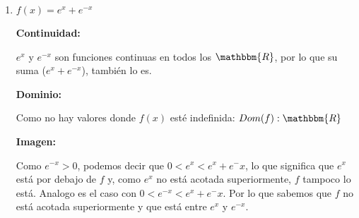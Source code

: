 \documentclass[12pt]{article}
\begin{document}
\begin{enumerate}[\hspace{9px} a)]
        \textbf{Crecencia: }
            \begin{equation*}
                f'(x)>0 \Rightarrow e^{\sin(x)}\cdot\cos(x)>0
            \end{equation*}

            Como \(e^{\sin(x)}\) es mayor a o siempre, \(f'(x)\) ser\'a mayor a 0 cuando \(\cos(x)>0\)\medskip

            Sabemos, por la definici\'on de \(\cos(x)\), que este es mayor a 0 en \(\left(0,\displaystyle\frac{\pi}{2}\right)\cup\left(\frac{3\pi}{2},2\pi\right)\) y que eso se repite cada \(2\pi\) (Por su periodo).\medskip

            Analogo a lo anterior, \(f'(x)<0\) s\'olo cuando \(\cos(x)<0\), que, por definici\'on, sucede en \(\left(\displaystyle\frac{\pi}{2},\frac{3\pi}{2}\right)\) y se repite cada \(2\pi\). Entonces:\medskip

            $f$ es creciente en: \quad \(\left(-\displaystyle\frac{\pi}{2}+2k\pi,\frac{\pi}{2}+2k\pi\right), k\in\mathbbm{Z}\)\medskip

            $f$ es decreciente en: \quad \(\left(\displaystyle\frac{\pi}{2}+2k\pi,\frac{3\pi}{2}+2k\pi\right), k\in\mathbbm{Z}\)\medskip

        \textbf{Puntos y valores de Inflexi\'on: }\medskip

        \textbf{Concavidad y Convexidad: }\medskip
        
        CONCAVIDAD:
        
        CONVEXIDAD:

        \textbf{Gr\'afica: }

    \item \(f(x)=e^x+e^{-x}\)\medskip
    
        \textbf{Continuidad: }\medskip

            \(e^x\) y \(e^{-x}\) son funciones continuas en todos los \(\mathbbm{R}\), por lo que su suma (\(e^x+e^{-x}\)), tambi\'en lo es.\medskip

        \textbf{Dominio: }\medskip

            Como no hay valores donde $f(x)$ est\'e indefinida: \(Dom(f):\mathbbm{R}\)\medskip

        \textbf{Imagen: }\medskip

            Como \(e^{-x}>0\), podemos decir que \(0<e^x<e^x+e^-x\), lo que significa que \(e^x\) est\'a por debajo de \(f\) y, como \(e^x\) no est\'a acotada superiormente, \(f\) tampoco lo est\'a. Analogo es el caso con \(0<e^{-x}<e^x+e^-x\). Por lo que sabemos que \(f\) no est\'a acotada superiormente y que est\'a entre \(e^x\) y \(e^{-x}\).\medskip


\end{enumerate}
\end{document}
